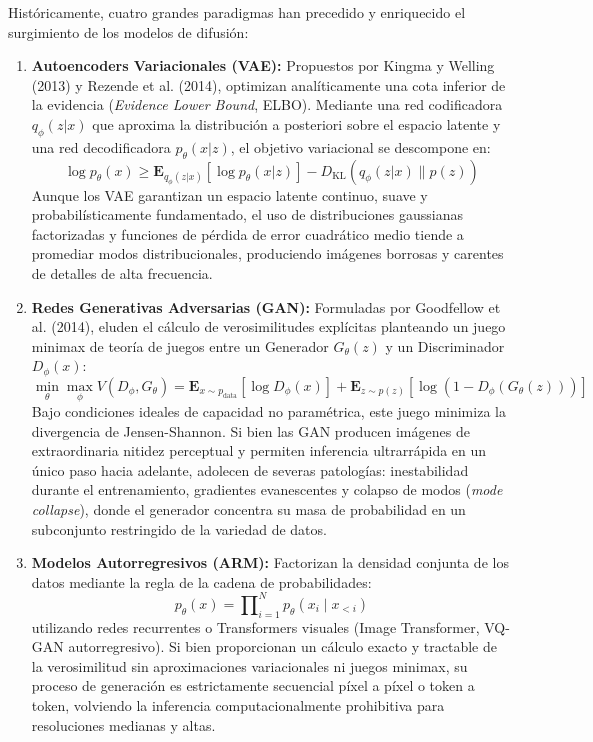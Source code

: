 Históricamente, cuatro grandes paradigmas han precedido y enriquecido el surgimiento de los modelos de difusión:

\begin{enumerate}
    \item \textbf{Autoencoders Variacionales (VAE):} Propuestos por Kingma y Welling (2013) y Rezende et al. (2014), optimizan analíticamente una cota inferior de la evidencia (\textit{Evidence Lower Bound}, ELBO). Mediante una red codificadora $q_\phi(z|x)$ que aproxima la distribución a posteriori sobre el espacio latente y una red decodificadora $p_\theta(x|z)$, el objetivo variacional se descompone en:
    \begin{equation}
    \log p_\theta(x) \ge \mathbf{E}_{q_\phi(z|x)}[\log p_\theta(x|z)] - D_{\mathrm{KL}}(q_\phi(z|x) \parallel p(z))
    \end{equation}
    Aunque los VAE garantizan un espacio latente continuo, suave y probabilísticamente fundamentado, el uso de distribuciones gaussianas factorizadas y funciones de pérdida de error cuadrático medio tiende a promediar modos distribucionales, produciendo imágenes borrosas y carentes de detalles de alta frecuencia.
    
    \item \textbf{Redes Generativas Adversarias (GAN):} Formuladas por Goodfellow et al. (2014), eluden el cálculo de verosimilitudes explícitas planteando un juego minimax de teoría de juegos entre un Generador $G_\theta(z)$ y un Discriminador $D_\phi(x)$:
    \begin{equation}
    \min_\theta \max_\phi V(D_\phi, G_\theta) = \mathbf{E}_{x \sim p_{\mathrm{data}}}[\log D_\phi(x)] + \mathbf{E}_{z \sim p(z)}[\log(1 - D_\phi(G_\theta(z)))]
    \end{equation}
    Bajo condiciones ideales de capacidad no paramétrica, este juego minimiza la divergencia de Jensen-Shannon. Si bien las GAN producen imágenes de extraordinaria nitidez perceptual y permiten inferencia ultrarrápida en un único paso hacia adelante, adolecen de severas patologías: inestabilidad durante el entrenamiento, gradientes evanescentes y colapso de modos (\textit{mode collapse}), donde el generador concentra su masa de probabilidad en un subconjunto restringido de la variedad de datos.
    
    \item \textbf{Modelos Autorregresivos (ARM):} Factorizan la densidad conjunta de los datos mediante la regla de la cadena de probabilidades:
    \begin{equation}
    p_\theta(x) = \prod\nolimits_{i=1}^N p_\theta(x_i \mid x_{<i})
    \end{equation}
    utilizando redes recurrentes o Transformers visuales (Image Transformer, VQ-GAN autorregresivo). Si bien proporcionan un cálculo exacto y tractable de la verosimilitud sin aproximaciones variacionales ni juegos minimax, su proceso de generación es estrictamente secuencial píxel a píxel o token a token, volviendo la inferencia computacionalmente prohibitiva para resoluciones medianas y altas.
    

\end{enumerate}
